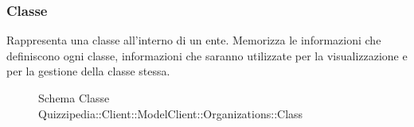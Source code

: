\subsubsection{Classe }
Rappresenta una classe all'interno di un ente. Memorizza le informazioni che definiscono ogni classe,
informazioni che saranno utilizzate per la visualizzazione e per la gestione della classe stessa.
\begin{figure}[H]
\centering
\noindent{}
\caption[Schema Classe Class]{Schema Classe Quizzipedia::Client::ModelClient::Organizations::Class}
\end{figure}
